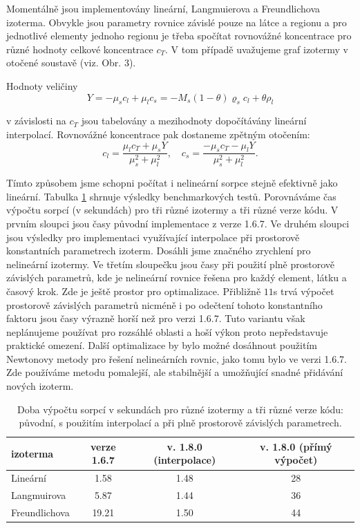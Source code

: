 Momentálně jsou implementovány lineární, Langmuierova a Freundlichova izoterma. 
Obvykle jsou parametry rovnice závislé pouze na látce a regionu a pro 
jednotlivé elementy jednoho regionu je třeba spočítat rovnovážné koncentrace pro 
různé hodnoty celkové koncentrace $c_T$. V tom případě uvažujeme graf izotermy 
v otočené soustavě (viz. Obr. 3).

Hodnoty veličiny
\[
    Y=-\mu_s c_l + \mu_l c_s =  -M_s(1-\theta) \varrho_s c_l + \theta\rho_l 
\]

v závislosti na $c_T$ jsou tabelovány a mezihodnoty dopočítávány lineární 
interpolací. Rovnovážné koncentrace pak dostaneme zpětným otočením:
\[
    c_l = \frac{\mu_l c_T + \mu_s Y}{\mu_s^2+\mu_l^2},\quad c_s = 
\frac{-\mu_s c_T - \mu_l Y}{\mu_s^2 + \mu_l^2}.
\]

Tímto způsobem jsme schopni počítat i nelineární sorpce stejně efektivně jako 
lineární. Tabulka \ref{tab:isoterm_timing} shrnuje výsledky benchmarkových 
testů. Porovnáváme čas výpočtu sorpcí (v sekundách) pro tři různé izotermy a 
tři 
různé verze kódu. V prvním sloupci jsou časy původní implementace z verze 1.6.7. 
Ve druhém sloupci jsou výsledky pro implementaci využívající interpolace při 
prostorově konstantních parametrech izoterm. Dosáhli jsme značného zrychlení 
pro 
nelineární izotermy. Ve třetím sloupečku jsou časy při použití  plně prostorově 
závislých parametrů, kde je nelineární rovnice řešena pro každý element, látku 
a časový krok. Zde je ještě prostor pro optimalizace. Přibližně $11$s trvá 
výpočet prostorově závislých parametrů nicméně i po odečtení tohoto konstantního 
faktoru jsou časy výrazně horší než pro verzi 1.6.7. Tuto variantu však 
neplánujeme používat pro rozsáhlé oblasti a hoší výkon proto nepředstavuje 
praktické omezení. Další optimalizace by bylo možné dosáhnout použitím Newtonovy 
metody pro řešení nelineárních rovnic, jako tomu bylo ve verzi 1.6.7. Zde 
používáme metodu pomalejší, ale stabilnější a umožňující snadné přidávání nových 
izoterm.

\renewcommand{\arraystretch}{1.5}
\begin{table}
\begin{center}
\begin{tabular}{|l||c|c|c|}
\hline
izoterma & verze 1.6.7 & v. 1.8.0 (interpolace) & v. 1.8.0 (přímý výpočet) \\
\hline
Lineární & 1.58        & 1.48                   & 28\\
Langmuirova & 5.87     & 1.44                   & 36\\
Freundlichova& 19.21   & 1.50                   & 44\\
\hline
\end{tabular}
\end{center}
\caption{\label{tab:isoterm_timing}
Doba výpočtu sorpcí v sekundách pro různé izotermy a tři různé verze 
kódu: původní, s použitím interpolací a při plně prostorově závislých 
parametrech.}
\end{table}
